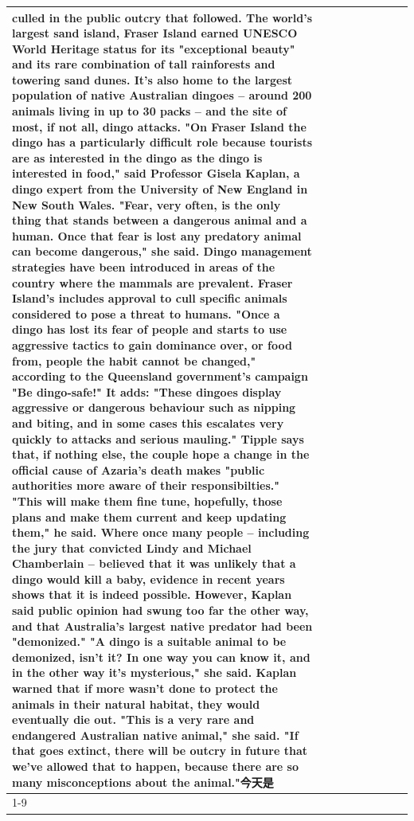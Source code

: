 \begin{table}[H]
\begin{tabular}{lllrlllll}
culled in the public outcry that followed. The world's largest sand island, Fraser Island earned UNESCO World Heritage status for its "exceptional beauty" and its rare combination of tall rainforests and towering sand dunes. It's also home to the largest population of native Australian dingoes -- around 200 animals living in up to 30 packs -- and the site of most, if not all, dingo attacks. "On Fraser Island the dingo has a particularly difficult role because tourists are as interested in the dingo as the dingo is interested in food," said Professor Gisela Kaplan, a dingo expert from the University of New England in New South Wales. "Fear, very often, is the only thing that stands between a dangerous animal and a human. Once that fear is lost any predatory animal can become dangerous," she said. Dingo management strategies have been introduced in areas of the country where the mammals are prevalent. Fraser Island's includes approval to cull specific animals considered to pose a threat to humans. "Once a dingo has lost its fear of people and starts to use aggressive tactics to gain dominance over, or food from, people the habit cannot be changed," according to the Queensland government's campaign "Be dingo-safe!" It adds: "These dingoes display aggressive or dangerous behaviour such as nipping and biting, and in some cases this escalates very quickly to attacks and serious mauling." Tipple says that, if nothing else, the couple hope a change in the official cause of Azaria's death makes "public authorities more aware of their responsibilties." "This will make them fine tune, hopefully, those plans and make them current and keep updating them," he said. Where once many people -- including the jury that convicted Lindy and Michael Chamberlain -- believed that it was unlikely that a dingo would kill a baby, evidence in recent years shows that it is indeed possible. However, Kaplan said public opinion had swung too far the other way, and that Australia's largest native predator had been "demonized." "A dingo is a suitable animal to be demonized, isn't it? In one way you can know it, and in the other way it's mysterious," she said. Kaplan warned that if more wasn't done to protect the animals in their natural habitat, they would eventually die out. "This is a very rare and endangered Australian native animal," she said. "If that goes extinct, there will be outcry in future that we've allowed that to happen, because there are so many misconceptions about the animal."今天是 \\
\cline{1-9}

\end{tabular}
\end{table}

